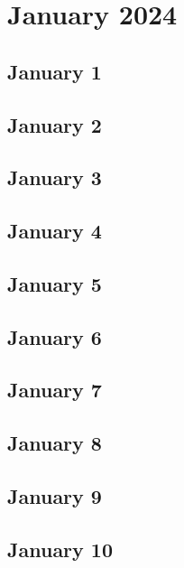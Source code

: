 %
%
%

\chapter{January 2024}
\label{intro} %

\section{January 1}

\section{January 2}

\section{January 3}

\section{January 4}

\section{January 5}

\section{January 6}

\section{January 7}

\section{January 8}

\section{January 9}

\section{January 10}

